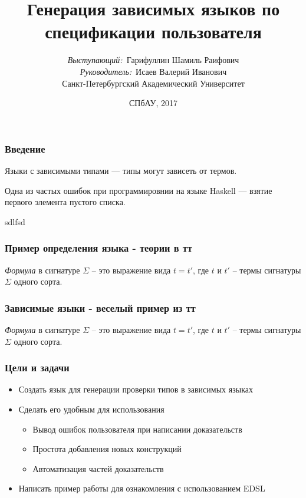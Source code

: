\documentclass[14pt]{beamer}
\title{\small{Генерация зависимых языков по спецификации пользователя}}
\author{\small{%
\emph{Выступающий:}~Гарифуллин Шамиль Раифович\\%
\emph{Руководитель:}~Исаев Валерий Иванович}\\%
\vspace{30pt}%
Санкт-Петербургский Академический Университет%
\vspace{20pt}%
}
\date{\small{СПбАУ, 2017}}
\begin{document}
\maketitle

\begin{frame}
\frametitle{Введение}
Языки с зависимыми типами --- типы могут зависеть от термов.

Одна из частых ошибок при программировнии на языке Haskell --- взятие первого элемента пустого списка.

sdlfsd

\end{frame}


\begin{frame}
\frametitle{Пример определения языка - теории в тт}
\emph{Формула} в сигнатуре $\Sigma$ -- это выражение вида $t = t'$, где $t$ и $t'$ -- термы сигнатуры $\Sigma$ одного сорта.

\end{frame}


\begin{frame}
\frametitle{Зависимые языки - веселый пример из тт}
\emph{Формула} в сигнатуре $\Sigma$ -- это выражение вида $t = t'$, где $t$ и $t'$ -- термы сигнатуры $\Sigma$ одного сорта.

\end{frame}

\begin{frame}
\frametitle{Цели и задачи}
\begin{itemize} %
  \item Создать язык для генерации проверки типов в зависимых языках
  \item Сделать его удобным для использования
  \begin{itemize}
    \item Вывод ошибок пользователя при написании доказательств
    \item Простота добавления новых конструкций
    \item Автоматизация частей доказательств
  \end{itemize}
  \item Написать пример работы для ознакомления с использованием EDSL
\end{itemize}
\end{frame}
\end{document}
